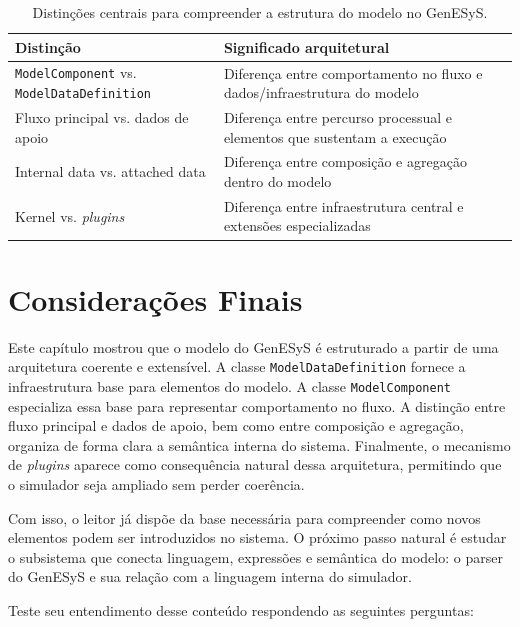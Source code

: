 \begin{table}[htbp]
    \centering
    \caption{Distinções centrais para compreender a estrutura do modelo no GenESyS.}
    \label{tab:cap8_distincoes_centrais}
    \small
    \begin{tabular}{|p{3.8cm}|p{7.4cm}|}
        \hline
        \textbf{Distinção} & \textbf{Significado arquitetural} \\
        \hline
        \texttt{ModelComponent} vs. \texttt{ModelDataDefinition} & Diferença entre comportamento no fluxo e dados/infraestrutura do modelo \\
        \hline
        Fluxo principal vs. dados de apoio & Diferença entre percurso processual e elementos que sustentam a execução \\
        \hline
        Internal data vs. attached data & Diferença entre composição e agregação dentro do modelo \\
        \hline
        Kernel vs. \textit{plugins} & Diferença entre infraestrutura central e extensões especializadas \\
        \hline
    \end{tabular}
\end{table}

\section{Considerações Finais}
\label{sec:cap8_consideracoes_finais}

Este capítulo mostrou que o modelo do GenESyS é estruturado a partir de uma arquitetura coerente e extensível. A classe \texttt{ModelDataDefinition} fornece a infraestrutura base para elementos do modelo. A classe \texttt{ModelComponent} especializa essa base para representar comportamento no fluxo. A distinção entre fluxo principal e dados de apoio, bem como entre composição e agregação, organiza de forma clara a semântica interna do sistema. Finalmente, o mecanismo de \textit{plugins} aparece como consequência natural dessa arquitetura, permitindo que o simulador seja ampliado sem perder coerência.

Com isso, o leitor já dispõe da base necessária para compreender como novos elementos podem ser introduzidos no sistema. O próximo passo natural é estudar o subsistema que conecta linguagem, expressões e semântica do modelo: o parser do GenESyS e sua relação com a linguagem interna do simulador.

Teste seu entendimento desse conteúdo respondendo as seguintes perguntas:

